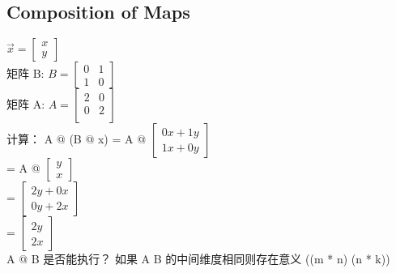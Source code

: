\documentclass[12pt]{article}
\begin{document}
\begin{flushleft}
\section*{Composition of Maps}

$\vec{x} = \begin{bmatrix}
    x \\
    y
\end{bmatrix}$ \\
矩阵 B: 
$B  = \begin{bmatrix}
    0 & 1 \\
    1 & 0
\end{bmatrix}$ \\
矩阵 A: 
$ A  = \begin{bmatrix}
    2 & 0 \\
    0 & 2 \\
\end{bmatrix}$ \\

计算： A @ (B @ x) 
= A @ $\begin{bmatrix}
    0x + 1y \\
    1x + 0y
\end{bmatrix}$ \\
= A @ $\begin{bmatrix}
    y \\
    x
\end{bmatrix}$ \\
= $\begin{bmatrix}
    2y + 0x \\
    0y + 2x
\end{bmatrix}$ \\
= $\begin{bmatrix}
    2y \\
    2x
\end{bmatrix}$ \\

A @ B 是否能执行？
如果 A B 的中间维度相同则存在意义 ((m * n) (n * k))


\end{flushleft}
\end{document}
